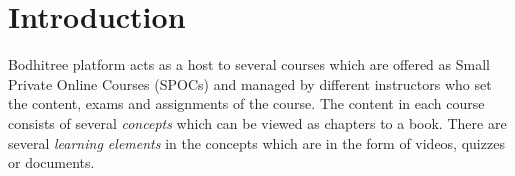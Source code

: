 \section{Introduction}

\hspace{0.45cm} Bodhitree platform acts as a host to several courses which are offered as Small Private Online Courses (SPOCs) and managed by different instructors who set the content, exams and assignments of the course. The content in each course consists of several \textit{concepts} which can be viewed as chapters to a book. There are several \textit{learning elements} in the concepts which are in the form of videos, quizzes or documents.

